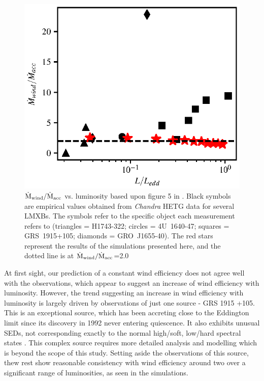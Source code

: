 \documentclass[a4paper,fleqn,usenatbib]{mnras}
\begin{document}
\begin{figure}
\includegraphics[width=\columnwidth]{figures/ponti.eps}
\caption{$\rm{\dot{M}_{wind}/\dot{M}_{acc}}$ vs. luminosity based upon figure 5 in \citet{2012MNRAS.422L..11P}. 
Black symbols are empirical values obtained from {\em Chandra} HETG data for several LMXBs. 
The symbols refer to the specific object each measurement refers to 
(triangles = H1743-322; circles = 4U~1640-47; squares = GRS~1915+105; diamonds = GRO~J1655-40). 
The red stars represent the results of the simulations presented here, and the dotted line
is at $\rm{\dot{M}_{wind}/\dot{M}_{acc}}$=2.0}
\label{figure:mdot_vs_lum}
\end{figure}

At first sight, our prediction of a constant wind efficiency does not
agree well with the observations, which appear to suggest an increase of wind efficiency with
luminosity. However, the trend suggesting an increase in wind efficiency with luminosity is largely driven 
by observations of just one source - GRS 1915 +105.  This is an exceptional source, which has been 
accreting close to the Eddington limit since its discovery in 1992 \citep{1994ApJS...92..469C,
2017MNRAS.468.4748C} never
entering quiescence. It also exhibits unusual SEDs, not corresponding exactly to the normal high/soft,
low/hard spectral states \cite{2016ApJ...833..165Z}. This complex source requires more detailed
analysis and modelling which is beyond the scope of this study. Setting aside the observations of this
source, thew rest show reasonable consistency with wind efficiency around two over a significant 
range of luminosities, as seen in the simulations.
\end{document}
